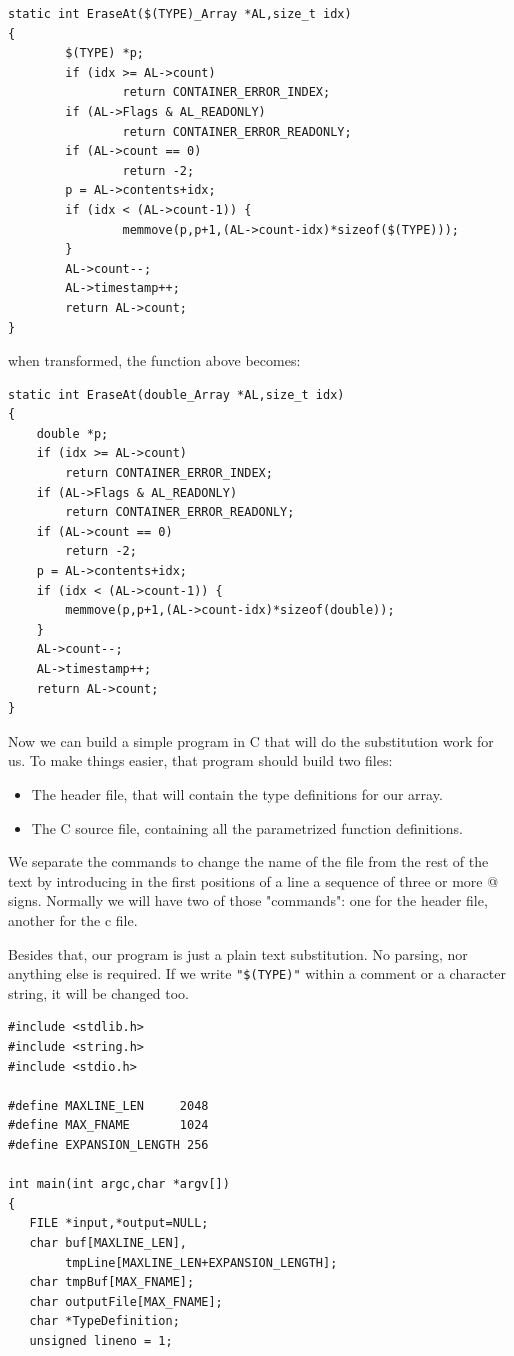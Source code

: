 \documentclass[12pt,a4paper]{memoir} %
\begin{document}
{{\begin{verbatim}
static int EraseAt($(TYPE)_Array *AL,size_t idx)
{
        $(TYPE) *p;
        if (idx >= AL->count)
                return CONTAINER_ERROR_INDEX;
        if (AL->Flags & AL_READONLY)
                return CONTAINER_ERROR_READONLY;
        if (AL->count == 0)
                return -2;
        p = AL->contents+idx;
        if (idx < (AL->count-1)) {
                memmove(p,p+1,(AL->count-idx)*sizeof($(TYPE)));
        }
        AL->count--;
        AL->timestamp++;
        return AL->count;
}
\end{verbatim}

when transformed, the function above becomes:

\begin{verbatim}
static int EraseAt(double_Array *AL,size_t idx)
{
    double *p;
    if (idx >= AL->count)
        return CONTAINER_ERROR_INDEX;
    if (AL->Flags & AL_READONLY)
        return CONTAINER_ERROR_READONLY;
    if (AL->count == 0)
        return -2;
    p = AL->contents+idx;
    if (idx < (AL->count-1)) {
        memmove(p,p+1,(AL->count-idx)*sizeof(double));
    }
    AL->count--;
    AL->timestamp++;
    return AL->count;
}
\end{verbatim}

Now we can build a simple program in C that will do the substitution work for us. To make things easier, that program should build two files:
\begin{itemize}
\item The header file, that will contain the type definitions for our array.
\item The C source file, containing all the parametrized function definitions.
\end{itemize}
We separate the commands to change the name of the file from the rest of the text by introducing in the first positions of a line a sequence of three or more @ signs.  Normally we will have two of those "commands": one for the header file, another for the c file.

Besides that, our program is just a plain text substitution. No parsing, nor anything else is required. If we write \texttt{"\$(TYPE)"} within a comment or a character string, it will be changed too.
\begin{verbatim}
#include <stdlib.h>
#include <string.h>
#include <stdio.h>

#define MAXLINE_LEN     2048
#define MAX_FNAME       1024
#define EXPANSION_LENGTH 256

int main(int argc,char *argv[])
{
   FILE *input,*output=NULL;
   char buf[MAXLINE_LEN],
        tmpLine[MAXLINE_LEN+EXPANSION_LENGTH];
   char tmpBuf[MAX_FNAME];
   char outputFile[MAX_FNAME];
   char *TypeDefinition;
   unsigned lineno = 1;


\end{verbatim}}}
\end{document}
